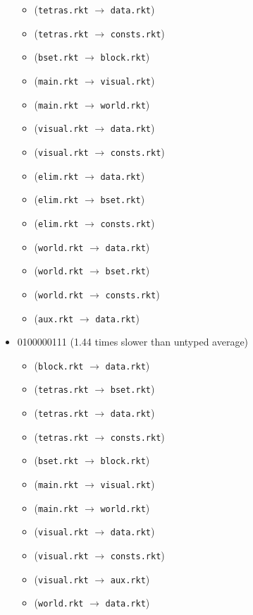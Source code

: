 \documentclass{article}
\newcommand{\mono}[1]{\texttt{#1}}
\begin{document}
\begin{itemize}
\begin{itemize}
  \item (\mono{tetras.rkt} $\rightarrow$ \mono{data.rkt})
  \item (\mono{tetras.rkt} $\rightarrow$ \mono{consts.rkt})
  \item (\mono{bset.rkt} $\rightarrow$ \mono{block.rkt})
  \item (\mono{main.rkt} $\rightarrow$ \mono{visual.rkt})
  \item (\mono{main.rkt} $\rightarrow$ \mono{world.rkt})
  \item (\mono{visual.rkt} $\rightarrow$ \mono{data.rkt})
  \item (\mono{visual.rkt} $\rightarrow$ \mono{consts.rkt})
  \item (\mono{elim.rkt} $\rightarrow$ \mono{data.rkt})
  \item (\mono{elim.rkt} $\rightarrow$ \mono{bset.rkt})
  \item (\mono{elim.rkt} $\rightarrow$ \mono{consts.rkt})
  \item (\mono{world.rkt} $\rightarrow$ \mono{data.rkt})
  \item (\mono{world.rkt} $\rightarrow$ \mono{bset.rkt})
  \item (\mono{world.rkt} $\rightarrow$ \mono{consts.rkt})
  \item (\mono{aux.rkt} $\rightarrow$ \mono{data.rkt})
  \end{itemize}
\item 0100000111 (1.44 times slower than untyped average)
  \begin{itemize}
  \item (\mono{block.rkt} $\rightarrow$ \mono{data.rkt})
  \item (\mono{tetras.rkt} $\rightarrow$ \mono{bset.rkt})
  \item (\mono{tetras.rkt} $\rightarrow$ \mono{data.rkt})
  \item (\mono{tetras.rkt} $\rightarrow$ \mono{consts.rkt})
  \item (\mono{bset.rkt} $\rightarrow$ \mono{block.rkt})
  \item (\mono{main.rkt} $\rightarrow$ \mono{visual.rkt})
  \item (\mono{main.rkt} $\rightarrow$ \mono{world.rkt})
  \item (\mono{visual.rkt} $\rightarrow$ \mono{data.rkt})
  \item (\mono{visual.rkt} $\rightarrow$ \mono{consts.rkt})
  \item (\mono{visual.rkt} $\rightarrow$ \mono{aux.rkt})
  \item (\mono{world.rkt} $\rightarrow$ \mono{data.rkt})

\end{itemize}
\end{itemize}
\end{document}

